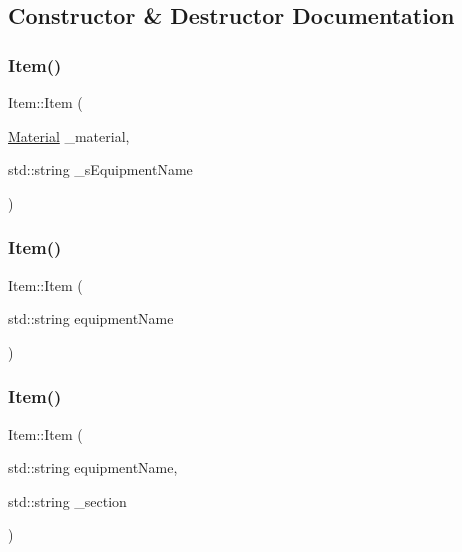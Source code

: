 \subsection{Constructor \& Destructor Documentation}
\mbox{\label{class_item_a931e8f47fe5a367166280f28edca3950}} 
\subsubsection{\texorpdfstring{Item()}{Item()}\hspace{0.1cm}{\footnotesize\ttfamily [1/5]}}
{\footnotesize\ttfamily Item\+::\+Item (\begin{DoxyParamCaption}\item[{\mbox{\hyperlink{class_material}{Material}}}]{\+\_\+material,  }\item[{std\+::string}]{\+\_\+s\+Equipment\+Name }\end{DoxyParamCaption})}

\mbox{\label{class_item_aa7071a91f151036f7fd1a87e12a07f83}} 
\subsubsection{\texorpdfstring{Item()}{Item()}\hspace{0.1cm}{\footnotesize\ttfamily [2/5]}}
{\footnotesize\ttfamily Item\+::\+Item (\begin{DoxyParamCaption}\item[{std\+::string}]{equipment\+Name }\end{DoxyParamCaption})}

\mbox{\label{class_item_ac84b16ca0e3ce8554dbd817d62bcbab0}} 
\subsubsection{\texorpdfstring{Item()}{Item()}\hspace{0.1cm}{\footnotesize\ttfamily [3/5]}}
{\footnotesize\ttfamily Item\+::\+Item (\begin{DoxyParamCaption}\item[{std\+::string}]{equipment\+Name,  }\item[{std\+::string}]{\+\_\+section }\end{DoxyParamCaption})}

